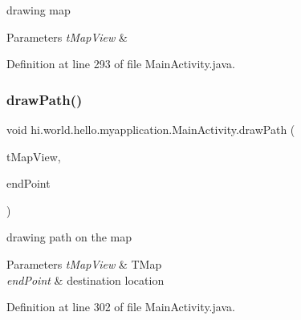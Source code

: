 drawing map 


\begin{DoxyParams}{Parameters}
{\em t\+Map\+View} & \\
\hline
\end{DoxyParams}


Definition at line 293 of file Main\+Activity.\+java.


\begin{DoxyCode}{0}

\end{DoxyCode}
\mbox{\label{classhi_1_1world_1_1hello_1_1myapplication_1_1_main_activity_ad6e4c482ccc7d1630168ed10874a26e7}} 
\subsubsection{\texorpdfstring{drawPath()}{drawPath()}}
{\footnotesize\ttfamily void hi.\+world.\+hello.\+myapplication.\+Main\+Activity.\+draw\+Path (\begin{DoxyParamCaption}\item[{final T\+Map\+View}]{t\+Map\+View,  }\item[{T\+Map\+P\+O\+I\+Item}]{end\+Point }\end{DoxyParamCaption})}



drawing path on the map 


\begin{DoxyParams}{Parameters}
{\em t\+Map\+View} & T\+Map \\
\hline
{\em end\+Point} & destination location \\
\hline
\end{DoxyParams}


Definition at line 302 of file Main\+Activity.\+java.


